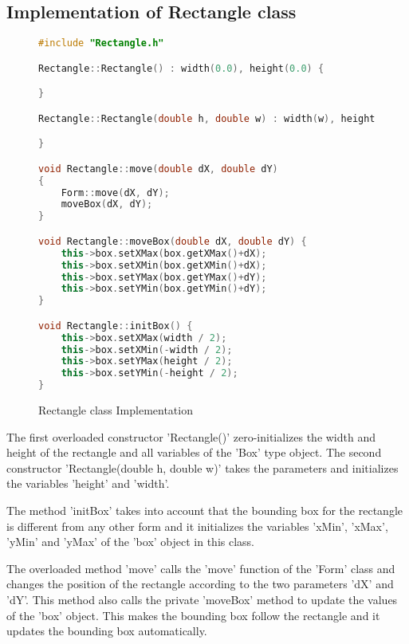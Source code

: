 \documentclass[a4paper, 10pt]{article}
\begin{document}
\subsection{Implementation of Rectangle class}
\begin{figure}[H]
\begin{lstlisting}[language=c++]
#include "Rectangle.h"

Rectangle::Rectangle() : width(0.0), height(0.0) {

}

Rectangle::Rectangle(double h, double w) : width(w), height(h) {

}

void Rectangle::move(double dX, double dY)
{
	Form::move(dX, dY);
	moveBox(dX, dY);
}

void Rectangle::moveBox(double dX, double dY) {
	this->box.setXMax(box.getXMax()+dX);
	this->box.setXMin(box.getXMin()+dX);
	this->box.setYMax(box.getYMax()+dY);
	this->box.setYMin(box.getYMin()+dY);
}

void Rectangle::initBox() {
	this->box.setXMax(width / 2);
	this->box.setXMin(-width / 2);
	this->box.setYMax(height / 2);
	this->box.setYMin(-height / 2);
}
\end{lstlisting}
\caption{Rectangle class Implementation}
\end{figure}
The first overloaded constructor 'Rectangle()' zero-initializes the width and height of the rectangle and all variables of the 'Box' type object. The second constructor 'Rectangle(double h, double w)' takes the parameters and initializes the variables 'height' and 'width'.

The method 'initBox' takes into account that the bounding box for the rectangle is different from any other form and it initializes the variables 'xMin', 'xMax', 'yMin' and 'yMax' of the 'box' object in this class.

The overloaded method 'move' calls the 'move' function of the 'Form' class and changes the position of the rectangle according to the two parameters 'dX' and 'dY'. This method also calls the private 'moveBox' method to update the values of the 'box' object. This makes the bounding box follow the rectangle and it updates the bounding box automatically.
\end{document}
